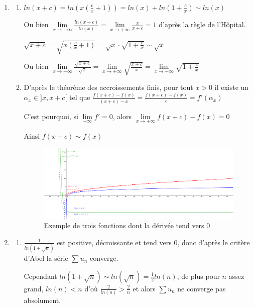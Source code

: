 \documentclass[]{article}
\begin{document}
\begin{enumerate}
\begin{enumerate}
\end{enumerate}

\item
\begin{enumerate}
	\item $ln(x+c)=ln\left(x\left(\frac{c}{x}+1\right)\right)=ln(x)+ln\left(1+\frac{c}{x}\right) \sim ln(x)$
	
	Ou bien $\lim\limits_{x \to +\infty} \frac{ln(x+c)}{ln(x)}=\lim\limits_{x \to +\infty} \frac{x}{x+c}=1$ d'après la règle de l'Hôpital.
	
	$\sqrt{x+c}=\sqrt{x\left(\frac{c}{x}+1\right)}=\sqrt{x} \cdot \sqrt{1+\frac{c}{x}} \sim \sqrt{x}$
	
	Ou bien $\lim\limits_{x \to +\infty} \frac{\sqrt{x+c}}{\sqrt{x}}=\lim\limits_{x \to +\infty} \sqrt{\frac{x+c}{x}}=\lim\limits_{x \to +\infty} \sqrt{1+\frac{c}{x}}$
	
	\item D'après le théorème des accroissements finis, pour tout $x > 0$ il existe un $\alpha_x \in ]x, x+c[$ tel que $\frac{f(x+c)-f(x)}{(x+c)-x}=\frac{f(x+c)-f(x)}{c}=f'(\alpha_x)$
	
	C'est pourquoi, si $\lim\limits_{+\infty}f'=0$, alors $\lim\limits_{x \to +\infty} f(x+c)-f(x)=0$
	
	Ainsi $f(x+c) \sim f(x)$
	
	\begin{figure}[!h]
		\includegraphics[width=350pt]{Images/DeriveNulle}
		\caption{Exemple de trois fonctions dont la dérivée tend vers 0}
	\end{figure}
\end{enumerate}

\item
\begin{enumerate}
	\item $\frac{1}{ln(1+\sqrt{n})}$ est positive, décroissante et tend vers $0$, donc d'après le critère d'Abel la série $\sum u_n$ converge.
	
	Cependant $ln(1+\sqrt{n}) \sim ln(\sqrt{n})=\frac{1}{2}ln(n)$, de plus pour $n$ assez grand, $ln(n) < n$ d'où $\frac{2}{ln(n)} > \frac{2}{n}$ et alors $\sum u_n$ ne converge pas absolument.
	

\end{enumerate}
\end{enumerate}
\end{document}
